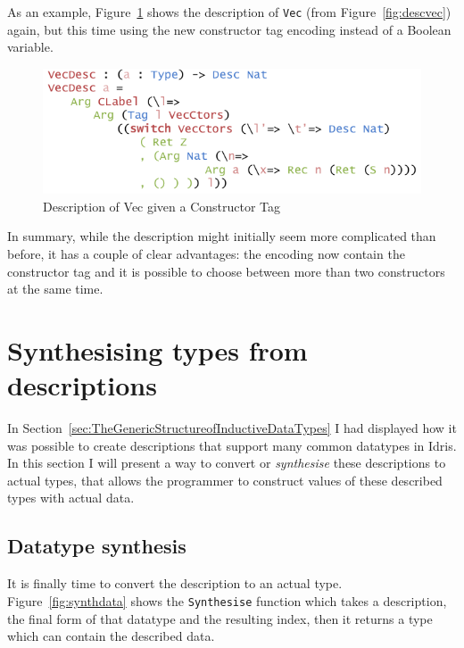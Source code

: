 \documentclass{ituthesis}
\newcommand{\tttype}[1]{\textcolor{type-color}{\texttt{#1}}}
\newcommand{\ttdec}[1]{\textcolor{declared-var-color}{\texttt{#1}}}
\theoremstyle{break}
\begin{document}
As an example, Figure~\ref{fig:vecdescim} shows the description of \tttype{Vec} (from Figure~\ref{fig:descvec}) again, but this time using the new constructor tag encoding instead of a Boolean variable.

\begin{figure}[H]
\begin{center}
    \includegraphics[scale=0.5]{Figures/VectorDescriptionImproved.png}
\end{center}
\caption{Description of Vec given a Constructor Tag}
\label{fig:vecdescim}
\end{figure}

In summary, while the description might initially seem more complicated than before, it has a couple of clear advantages: the encoding now contain the constructor tag and it is possible to choose between more than two constructors at the same time.

\section{Synthesising types from descriptions}
\label{sec:SynthesisingDescriptionstoTypes}
In Section~\ref{sec:TheGenericStructureofInductiveDataTypes} I had displayed how it was possible to create descriptions that support many common datatypes in Idris.
In this section I will present a way to convert or \textit{synthesise} these descriptions to actual types, that allows the programmer to construct values of these described types with actual data.

\subsection{Datatype synthesis}
\label{sub:DatatypeSynthesis}
It is finally time to convert the description to an actual type. Figure~\ref{fig:synthdata} shows the \ttdec{Synthesise} function which takes a description, the final form of that datatype and the resulting index, then it returns a type which can contain the described data.
\end{document}
